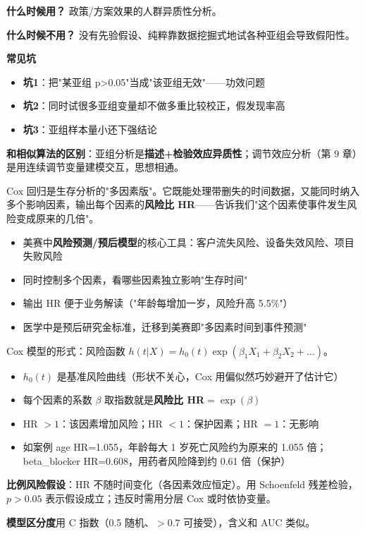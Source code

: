 \begin{algonotes}
\textbf{什么时候用？} 政策/方案效果的人群异质性分析。

\textbf{什么时候不用？} 没有先验假设、纯粹靠数据挖掘式地试各种亚组会导致假阳性。

\textbf{常见坑}
\begin{itemize}
    \item \textbf{坑1}：把"某亚组 p>0.05"当成"该亚组无效"——功效问题
    \item \textbf{坑2}：同时试很多亚组变量却不做多重比较校正，假发现率高
    \item \textbf{坑3}：亚组样本量小还下强结论
\end{itemize}

\textbf{和相似算法的区别}：亚组分析是\textbf{描述+检验效应异质性}；调节效应分析（第 9 章）是用连续调节变量建模交互，思想相通。
\end{algonotes}


\begin{algointro}
Cox 回归是生存分析的"多因素版"。它既能处理带删失的时间数据，又能同时纳入多个影响因素，输出每个因素的\textbf{风险比 HR}——告诉我们"这个因素使事件发生风险变成原来的几倍"。
\end{algointro}

\begin{algoscene}
\begin{itemize}
    \item 美赛中\textbf{风险预测/预后模型}的核心工具：客户流失风险、设备失效风险、项目失败风险
    \item 同时控制多个因素，看哪些因素独立影响"生存时间"
    \item 输出 HR 便于业务解读（"年龄每增加一岁，风险升高 5.5\%"）
    \item 医学中是预后研究金标准，迁移到美赛即"多因素时间到事件预测"
\end{itemize}
\end{algoscene}

\begin{algoprinciple}
Cox 模型的形式：风险函数 $h(t|X) = h_0(t) \exp(\beta_1 X_1 + \beta_2 X_2 + \dots)$。

\begin{itemize}
    \item $h_0(t)$ 是基准风险曲线（形状不关心，Cox 用偏似然巧妙避开了估计它）
    \item 每个因素的系数 $\beta$ 取指数就是\textbf{风险比 HR}$=\exp(\beta)$
    \item HR $>1$：该因素增加风险；HR $<1$：保护因素；HR $=1$：无影响
    \item 如案例 age HR=1.055，年龄每大 1 岁死亡风险约为原来的 1.055 倍；beta\_blocker HR=0.608，用药者风险降到约 0.61 倍（保护）
\end{itemize}

\textbf{比例风险假设}：HR 不随时间变化（各因素效应恒定）。用 Schoenfeld 残差检验，$p>0.05$ 表示假设成立；违反时需用分层 Cox 或时依协变量。

\textbf{模型区分度}用 C 指数（0.5 随机、$>0.7$ 可接受），含义和 AUC 类似。
\end{algoprinciple}


